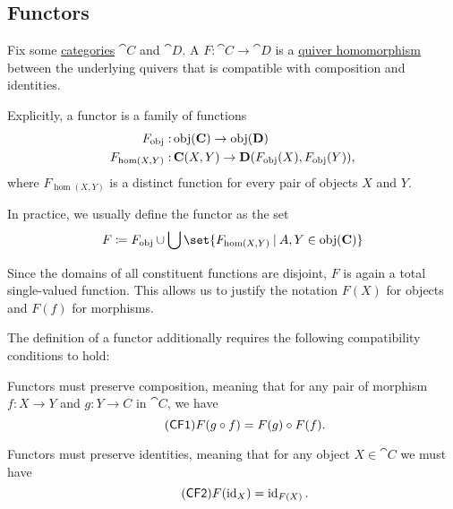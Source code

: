 \subsection{Functors}\label{subsec:functors}

\begin{definition}\label{def:functor}
  Fix some \hyperref[def:category]{categories} \( \cat{C} \) and \( \cat{D} \). A  \( F: \cat{C} \to \cat{D} \) is a \hyperref[def:theory_of_graphs/quiver_homomorphism]{quiver homomorphism} between the underlying quivers that is compatible with composition and identities.

  Explicitly, a functor is a family of functions
  \begin{equation}\label{eq:def:functor_as_family_of_function}
    \begin{aligned}
      F_{\operatorname{obj}}:       &\operatorname{obj}(\operatorname{\mathbf{C}}) \to \operatorname{obj}(\operatorname{\mathbf{D}}) \\
      F_{\hom(X, Y)}: &\operatorname{\mathbf{C}}(X, Y) \to \operatorname{\mathbf{D}}(F_{\operatorname{obj}}(X), F_{\operatorname{obj}}(Y)),
    \end{aligned}
  \end{equation}
  where \( F_{\hom(X, Y)} \) is a distinct function for every pair of objects \( X \) and \( Y \).

  In practice, we usually define the functor as the set
  \begin{equation}\label{eq:def:functor_as_single_function}
    F \coloneqq F_{\obj} \cup \bigcup\set{ F_{\hom(X, Y)} \given A, Y \in \obj(\cat{C}) }
  \end{equation}

  Since the domains of all constituent functions are disjoint, \( F \) is again a total single-valued function. This allows us to justify the notation \( F(X) \) for objects and \( F(f) \) for morphisms.

  The definition of a functor additionally requires the following compatibility conditions to hold:
  \begin{thmenum}[series=def:category]
     Functors must preserve composition, meaning that for any pair of morphism \( f: X \to Y \) and \( g: Y \to C \) in \( \cat{C} \), we have
    \begin{equation}\label{eq:def:category/CF1}\tag{\logic{CF1}}
      F(g \bincirc f) = F(g) \bincirc F(f).
    \end{equation}

     Functors must preserve identities, meaning that for any object \( X \in \cat{C} \) we must have
    \begin{equation}\label{eq:def:category/CF2}\tag{\logic{CF2}}
      F(\id_X) = \id_{F(X)}.
    \end{equation}
  \end{thmenum}
\end{definition}

